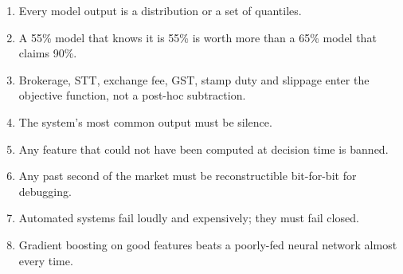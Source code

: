 \begin{enumerate}
\item {} Every model output is a
distribution or a set of quantiles.
\item {} A 55\% model that knows it is 55\%
is worth more than a 65\% model that claims 90\%.
\item {} Brokerage, STT, exchange fee, GST,
stamp duty and slippage enter the objective function, not a post-hoc
subtraction.
\item {} The system's most common output
must be silence.
\item {} Any feature that could not have
been computed at decision time is banned.
\item {} Any past second of the market must be
reconstructible bit-for-bit for debugging.
\item {} Automated systems fail loudly and
expensively; they must fail closed.
\item {} Gradient boosting on good
features beats a poorly-fed neural network almost every time.
\end{enumerate}










